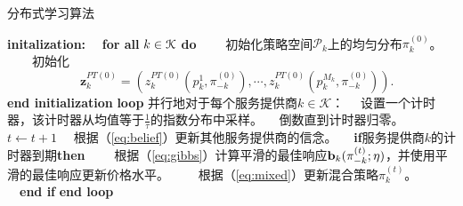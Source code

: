 \begin{algorithm}
\caption{分布式学习算法}
\label{alg:4}
\begin{algorithmic}[1]
\STATE \textbf{initalization:} 
\STATE ~~\textbf{for all} $k\in\mathcal{K}$ \textbf{do} 
\STATE ~~~~初始化策略空间$\mathcal{P}_k$上的均匀分布$\pi_{k}^{(0)}$。%
\STATE ~~~~初始化 
\begin{equation}
~~~~\mathbf{z}_k^{PT(0)}=\left(z_k^{PT(0)}(p_k^1, \pi^{(0)}_{-k}), \cdots, z_k^{PT(0)}(p_k^{M_k},\pi^{(0)}_{-k})\right).\nonumber%
\end{equation}\vspace{-0.8cm}
\STATE \textbf{end initialization}
\STATE \textbf{loop} 并行地对于每个服务提供商$k\in\mathcal{K}$：%
\STATE ~~设置一个计时器，该计时器从均值等于$\frac{1}{\tau}$的指数分布中采样。%
\STATE ~~倒数直到计时器归零。%
\STATE ~~$t\leftarrow t+1$
\STATE ~~根据（\ref{eq:belief}）更新其他服务提供商的信念。%
\STATE ~~\textbf{if}服务提供商$k$的计时器到期\textbf{then}%
\STATE ~~~~根据（\ref{eq:gibbs}）计算平滑的最佳响应$\bold{b}_k(\pi_{-k}^{(t)};\eta)$，并使用平滑的最佳响应更新价格水平。%
\STATE ~~~~根据（\ref{eq:mixed}）更新混合策略$\pi_k^{(t)}$。%
\STATE ~~\textbf{end if}
\STATE \textbf{end loop}
\end{algorithmic}
\end{algorithm}

